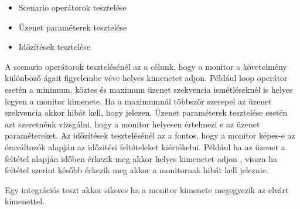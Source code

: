 \begin{itemize}
    \item Scenario operátorok tesztelése
    \item Üzenet paraméterek tesztelése
    \item Időzítések tesztelése
\end{itemize}

A scenario operátorok tesztelésénél az a célunk, hogy a monitor a követelmény különböző ágait figyelembe véve helyes kimenetet adjon.
Például loop operátor esetén a minimum, köztes és maximum üzenet szekvencia ismétléseknél is helyes legyen a monitor kimenete.
Ha a maximumnál többször szerepel az üzenet szekvencia akkor hibát kell, hogy jelezen.
Üzenet paraméterek tesztelése esetén azt szeretnénk vizsgálni, hogy a monitor helyesen értelmezi e az üzenet paramétereket.
Az időzítések tesztelésénél az a fontos, hogy a monitor képes-e az óraváltozók alapján az időzitési feltételeket kiértékelni.
Például ha az üzenet a feltétel alapján időben érkezik meg akkor helyes kimenetet adjon
, vissza ha feltétel szerint később érkezik meg akkor a monitornak hibát kell jeleznie.

Egy integrációs teszt akkor sikeres ha a monitor kimenete megegyezik az elvárt kimenettel.